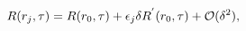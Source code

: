 \begin{equation}
R(r_{j},\tau)=R(r_{0},\tau)+\epsilon_{j} \delta
R^{'}(r_{0},\tau)+{\cal O}(\delta^2) ,
\end{equation}


